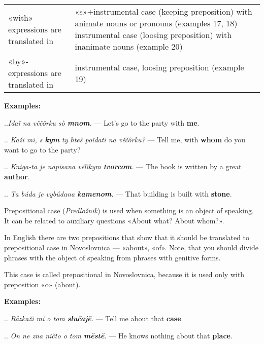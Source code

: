 \begin{table}
	\begin{tabular}{p{9em}p{9em}}
		«with»-expressions are translated in & «s»+instrumental case (keeping preposition) with animate nouns or pronouns (examples 17, 18)
		instrumental case (loosing preposition) with inanimate nouns (example 20) \\
		«by»-expressions are translated in &  instrumental case, loosing preposition (example 19) \\
	\end{tabular}
\end{table}

\textbf{Examples:}

..\textit{Idaǐ na věčôrku sò \textbf{mnom}.} — Let's go to the party with \textbf{me}.

.. \textit{Kaži mi, s \textbf{kym} ty hteš poǐdati na věčôrku?} — Tell me, with \textbf{whom} do you want to go to the party?

.. \textit{Kniga-ta je napisana vëlïkym \textbf{tvorcom}.} — The book is written by a great \textbf{author}.

.. \textit{Ta búda je vybúdana \textbf{kamenom}.} — That building is built with \textbf{stone}.

Prepositional case (\textit{Predložnik}) is used when something is an object of speaking. It can be related to auxiliary questions «About what? About whom?».

In English there are two prepositions that show that it should be translated to prepositional case in Novoslovnica — «about», «of». Note, that you should divide phrases with the object of speaking from phrases with genitive forms.

This case is called prepositional in Novoslovnica, because it is used only with preposition «o» (about).

\textbf{Examples:}

.. \textit{Råzkaži mi o tom \textbf{slučajě}.} — Tell me about that \textbf{case}.

.. \textit{On ne zna ničto o tom \textbf{městě}.} — He knows nothing about that \textbf{place}.

